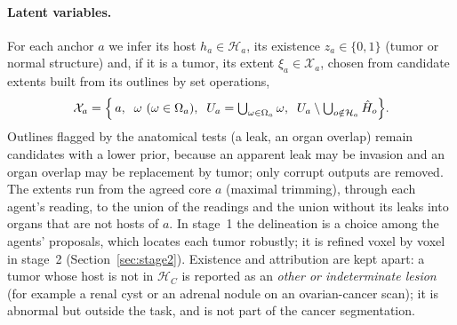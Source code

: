 \documentclass[fleqn,10pt]{olplainarticle}
\begin{document}
\paragraph{Latent variables.}
For each anchor $a$ we infer its host $h_a\in\mathcal{H}_a$, its existence $z_a\in\{0,1\}$ (tumor or normal structure)
and, if it is a tumor, its extent $\xi_a\in\mathcal{X}_a$, chosen from candidate extents built from its outlines by set
operations,
\begin{equation}
\label{eq:extents}
\mathcal{X}_a=\Bigl\{\,a,\;\;\omega\ (\omega\in\Omega_a),\;\;U_a=\textstyle\bigcup_{\omega\in\Omega_a}\omega,\;\;
U_a\setminus\bigcup_{o\notin\mathcal{H}_a}\hat H_{o}\Bigr\}.
\end{equation}
Outlines flagged by the anatomical tests (a leak, an organ overlap) remain candidates with a lower prior, because an
apparent leak may be invasion and an organ overlap may be replacement by tumor; only corrupt outputs are removed. The
extents run from the agreed core $a$ (maximal trimming), through each agent's reading, to the union of the readings and
the union without its leaks into organs that are not hosts of $a$. In stage~1 the delineation is a choice among the agents' proposals,
which locates each tumor robustly; it is refined voxel by voxel in stage~2 (Section~\ref{sec:stage2}). Existence and attribution are kept apart: a tumor whose
host is not in $\mathcal{H}_C$ is reported as an \emph{other or indeterminate lesion} (for example a renal cyst or an
adrenal nodule on an ovarian-cancer scan); it is abnormal but outside the task, and is not part of the cancer
segmentation.
\end{document}
